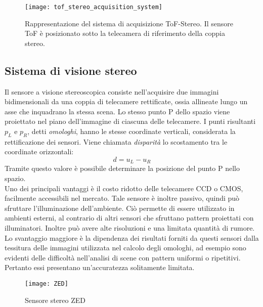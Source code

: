 \begin{figure}[ht]
    \centering
    \texttt{[image: tof\_stereo\_acquisition\_system]}
    \caption[Sistema di acquisizione ToF-Stereo]{Rappresentazione del sistema di acquisizione ToF-Stereo. Il sensore ToF è posizionato sotto la telecamera di riferimento della coppia stereo.}
\end{figure}

\subsection{Sistema di visione stereo}
Il sensore a visione stereoscopica consiste nell'acquisire due immagini bidimensionali da una coppia di telecamere rettificate, ossia allineate lungo un asse che inquadrano la stessa scena. Lo stesso punto P dello spazio viene proiettato nel piano dell'immagine di ciascuna delle telecamere. I punti risultanti \(p_L\) e \(p_R\), detti \textit{omologhi}, hanno le stesse coordinate verticali, considerata la rettificazione dei sensori. Viene chiamata \textit{disparità} lo scostamento tra le coordinate orizzontali: \[d = u_L - u_R\] Tramite questo valore è possibile determinare la posizione del punto P nello spazio.\\
Uno dei principali vantaggi è il costo ridotto delle telecamere CCD o CMOS, facilmente accessibili nel mercato. Tale sensore è inoltre passivo, quindi può sfruttare l’illuminazione dell’ambiente. Ciò permette di essere utilizzato in ambienti esterni, al contrario di altri sensori che sfruttano
pattern proiettati con illuminatori. Inoltre può avere alte risoluzioni e una limitata quantità di rumore.\\
Lo svantaggio maggiore è la dipendenza dei risultati forniti da questi sensori dalla tessitura delle immagini utilizzata nel calcolo degli omologhi, ad esempio sono evidenti delle difficoltà nell'analisi di scene con pattern uniformi o ripetitivi. Pertanto essi presentano un’accuratezza solitamente limitata.

\begin{figure}[ht]
    \centering
    \texttt{[image: ZED]}
    \caption[Sensore di visione stereo]{Sensore stereo ZED}
\end{figure}

